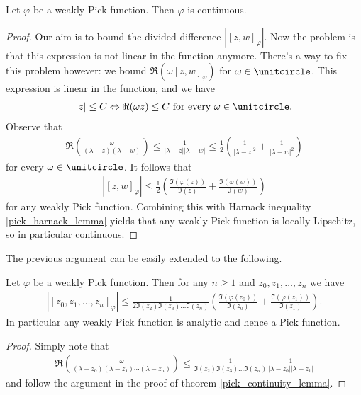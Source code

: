 \begin{lause}\label{pick_continuity_lemma}
	Let $\varphi$ be a weakly Pick function. Then $\varphi$ is continuous.
\end{lause}
\begin{proof}
	Our aim is to bound the divided difference $|[z, w]_{\varphi}|$. Now the problem is that this expression is not linear in the function anymore. There's a way to fix this problem however: we bound $\Re(\omega [z, w]_{\varphi})$ for $\omega \in \unitcircle$. This expression is linear in the function, and we have
	\begin{align*}
		|z| \leq C \Leftrightarrow \Re(\omega z) \leq C \text{ for every $\omega \in \unitcircle$}.
	\end{align*}
	Observe that
	\begin{align*}
		\Re\left(\frac{\omega}{(\lambda - z)(\lambda - w)} \right) \leq \frac{1}{|\lambda - z||\lambda - w|} \leq \frac{1}{2} \left( \frac{1}{|\lambda - z|^2} + \frac{1}{|\lambda - w|^2}\right)
	\end{align*}
	for every $\omega \in \unitcircle$. It follows that
	\begin{align*}
		|[z, w]_{\varphi}| \leq \frac{1}{2} \left(\frac{\Im(\varphi(z))}{\Im(z)} + \frac{\Im(\varphi(w))}{\Im(w)}\right)
	\end{align*}
	for any weakly Pick function. Combining this with Harnack inequality \ref{pick_harnack_lemma} yields that any weakly Pick function is locally Lipschitz, so in particular continuous.
\end{proof}

The previous argument can be easily extended to the following.

\begin{lause}\label{Hindmarsh_theorem}
	Let $\varphi$ be a weakly Pick function. Then for any $n \geq 1$ and $z_{0}, z_{1}, \ldots, z_{n}$ we have
	\begin{align*}
		|[z_{0}, z_{1}, \ldots, z_{n}]_{\varphi}| \leq \frac{1}{2 \Im(z_{2}) \Im(z_{3}) \ldots \Im(z_{n})} \left(\frac{\Im(\varphi(z_{0}))}{\Im(z_{0})} + \frac{\Im(\varphi(z_{1}))}{\Im(z_{1})}\right).
	\end{align*}
	In particular any weakly Pick function is analytic and hence a Pick function.
\end{lause}
\begin{proof}
	Simply note that
	\begin{align*}
		\Re\left(\frac{\omega}{(\lambda - z_{0})(\lambda - z_{1}) \cdots (\lambda - z_{n})} \right) \leq \frac{1}{\Im(z_{2}) \Im(z_{3}) \ldots \Im(z_{n})} \frac{1}{|\lambda - z_{0}||\lambda - z_{1}|}
	\end{align*}
	and follow the argument in the proof of theorem \ref{pick_continuity_lemma}.
\end{proof}

